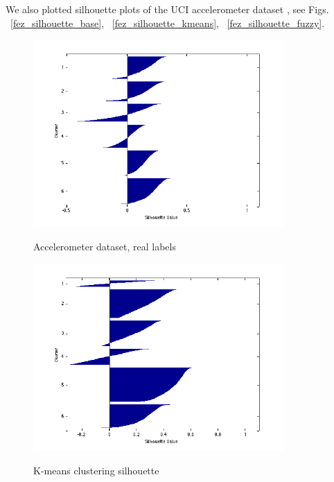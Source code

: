 \documentclass{article}
\begin{document}
We also plotted silhouette plots of the UCI accelerometer dataset , see Figs. ~\ref{fez_silhouette_base}, ~\ref{fez_silhouette_kmeans}, ~\ref{fez_silhouette_fuzzy}.

\begin{figure}[h!]
  \caption{Accelerometer dataset, real labels}
  \centering
    \includegraphics[width=0.85\textwidth]{fez_silhouette_real_labels.png}
  \label{fig:fez_silhouette_base}
\end{figure}

\begin{figure}[h!]
  \caption{K-means clustering silhouette}
  \centering
    \includegraphics[width=0.85\textwidth]{fez_silhouette_kmeans.png}
  \label{fig:fez_silhouette_kmeans}
\end{figure}
\end{document}
